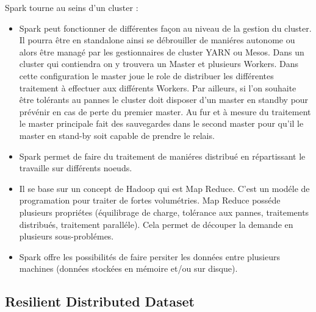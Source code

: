 Spark tourne au seins d'un cluster  :
\newline
\begin{itemize}
  \item Spark peut fonctionner de différentes façon au niveau de la gestion du cluster. Il pourra être en standalone ainsi se débrouiller de maniéres autonome ou alors être managé par les gestionnaires de cluster YARN ou Mesos. Dans un cluster qui contiendra on y trouvera un Master et plusieurs Workers. Dans cette configuration le master joue le role de distribuer les différentes traitement à effectuer aux différents Workers. Par ailleurs, si l'on souhaite être tolérants au pannes le cluster doit disposer d'un master en standby pour prévénir en cas de perte du premier master. Au fur et à mesure du traitement le master principale fait des sauvegardes dans le second master pour qu'il le master en stand-by soit capable de prendre le relais.
  \item Spark permet de faire du traitement de maniéres distribué en répartissant le travaille sur différents noeuds.
  \item Il se base sur un concept de Hadoop qui est Map Reduce. C'est un modéle de programation pour traiter de fortes volumétries. Map Reduce posséde plusieurs propriétes (équilibrage de charge, tolérance aux pannes, traitements distribués, traitement paralléle). Cela permet de découper la demande en plusieurs sous-problémes.
  \item Spark offre les possibilités de faire persiter les données entre plusieurs machines (données stockées en mémoire et/ou sur disque).
\end{itemize}

\subsection{Resilient Distributed Dataset}

